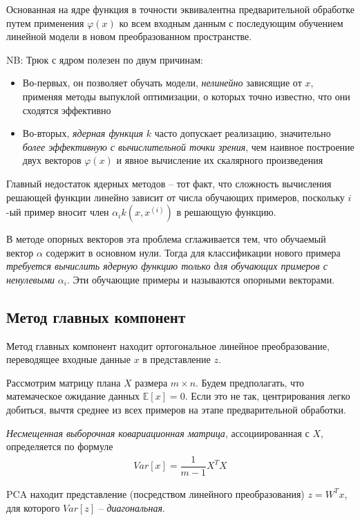 \documentclass[%
	11pt,
	a4paper,
	utf8,
]{article}
\begin{document}
Основанная на ядре функция в точности эквивалентна предварительной обработке путем применения $ \varphi(x) $ ко всем входным данным с последующим обучением линейной модели в новом преобразованном пространстве.

NB: Трюк с ядром полезен по двум причинам:
\begin{itemize}
	\item Во-первых, он позволяет обучать модели, \emph{нелинейно} зависящие от $ x $, применяя методы выпуклой оптимизации, о которых точно известно, что они сходятся эффективно
	
	\item  Во-вторых, \emph{ядерная функция} $ k $ часто допускает реализацию, значительно \emph{более эффективную с вычислительной точки зрения}, чем наивное построение двух векторов $ \varphi(x) $ и явное вычисление их скалярного произведения
\end{itemize}	

Главный недостаток ядерных методов -- тот факт, что сложность вычисления решающей функции линейно зависит от числа обучающих примеров, поскольку $ i $-ый пример вносит член $ \alpha_i k(x, x^{(i)}) $ в решающую функцию.

В методе опорных векторов эта проблема сглаживается тем, что обучаемый вектор $ \alpha $ содержит в основном нули. {\color{blue}Тогда для классификации нового примера \emph{требуется вычислить ядерную функцию только для обучающих примеров с ненулевыми} $ \alpha_i $.} Эти обучающие примеры и называются опорными векторами.

\subsection{Метод главных компонент}

Метод главных компонент находит ортогональное линейное преобразование, переводящее входные данные $ x $ в представление $ z $. 

Рассмотрим матрицу плана $ X $ размера $ m \times n $. Будем предполагать, что матемаческое ожидание данных $ \mathbb{E}[x] = 0 $. Если это не так, центрирования легко добиться, вычтя среднее из всех примеров на этапе предварительной обработки.

\emph{Несмещенная выборочная ковариационная матрица}, ассоциированная с $ X $, определяется по формуле
\begin{align*}
	Var[x] = \dfrac{1}{m - 1} X^T X
\end{align*}

PCA находит представление (посредством линейного преобразования) $ z = W^T x $, для которого $ Var[z] $ -- \emph{диагональная}.
\end{document}
